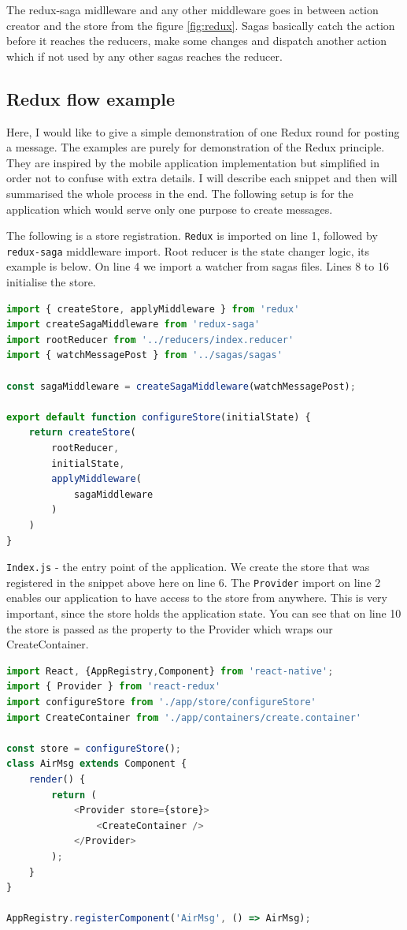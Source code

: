 \documentclass[thesis=M,english]{FITthesis}[2012/10/20]
\begin{document}
The redux-saga midlleware and any other middleware goes in between action creator and the store from the figure  \ref{fig:redux}. Sagas basically catch the action before it reaches the reducers, make some changes and dispatch another action which if not used by any other sagas reaches the reducer.

\subsection{Redux flow example}
Here, I would like to give a simple demonstration of one Redux round for posting a message. The examples are purely for demonstration of the Redux principle. They are inspired by the mobile application implementation but simplified in order not to confuse with extra details. I will describe each snippet and then will summarised the whole process in the end. The following setup is for the application which would serve only one purpose to create messages.

The following is a store registration. \verb|Redux| is imported on line 1, followed by \verb|redux-saga| middleware import. Root reducer is the state changer logic, its example is below.  On line 4 we import a watcher from sagas files. Lines 8 to 16 initialise the store.
\begin{lstlisting}[language=JavaScript]
import { createStore, applyMiddleware } from 'redux'
import createSagaMiddleware from 'redux-saga'
import rootReducer from '../reducers/index.reducer'
import { watchMessagePost } from '../sagas/sagas'

const sagaMiddleware = createSagaMiddleware(watchMessagePost);

export default function configureStore(initialState) {
    return createStore(
        rootReducer,
        initialState,
        applyMiddleware(
            sagaMiddleware
        )
    )
}
\end{lstlisting}

\verb|Index.js| - the entry point of the application. We create the store that was registered in the snippet above here on line 6. The \verb|Provider| import on line 2 enables our application to have access to the store from anywhere. This is very important, since the store holds the application state. You can see that on line 10 the store is passed as the property to the Provider which wraps our CreateContainer.

\begin{lstlisting}[language=JavaScript]
import React, {AppRegistry,Component} from 'react-native';
import { Provider } from 'react-redux'
import configureStore from './app/store/configureStore'
import CreateContainer from './app/containers/create.container'

const store = configureStore();
class AirMsg extends Component {
    render() {
        return (
            <Provider store={store}>
                <CreateContainer />
            </Provider>
        );
    }
}

AppRegistry.registerComponent('AirMsg', () => AirMsg);
\end{lstlisting}
\end{document}

